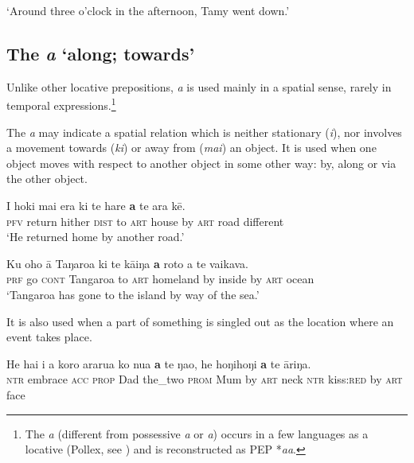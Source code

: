 \glt 
‘Around three o’clock in the afternoon, Tamy went down.’ \textstyleExampleref{[R315.273]} 
\z
{}
\subsection{The  \textit{a} ‘along; towards’}\label{sec:4.7.6}

Unlike other locative prepositions, \textit{a} is used mainly in a spatial sense, rarely in temporal expressions.\footnote{\label{fn:232}The  \textit{a} (different from possessive \textit{a} or \textit{{\ꞌ}a}) occurs in a few languages as a locative  (Pollex, see \citealt{GreenhillClark2011}) and is reconstructed as PEP *\textit{aa}.}  

The  \textit{a} may indicate a spatial relation which is neither stationary \mbox{(\textit{{\ꞌ}i}),} nor involves a movement towards (\textit{ki}) or away from (\textit{mai}) an object. It is used when one object moves with respect to another object in some other way: by, along or via the other object.

\ea\label{ex:4.278}
\gll I hoki mai era ki te hare \textbf{a} te ara kē. \\
\textsc{pfv} return hither \textsc{dist} to \textsc{art} house by \textsc{art} road different \\

\glt 
‘He returned home by another road.’ \textstyleExampleref{[R408.038]} 
\z

\ea\label{ex:4.279}
\gll Ku oho {\ꞌ}ā Taŋaroa ki te kāiŋa \textbf{a} roto a te vaikava. \\
\textsc{prf} go \textsc{cont} Tangaroa to \textsc{art} homeland by inside by \textsc{art} ocean \\

\glt
‘Tangaroa has gone to the island by way of the sea.’ \textstyleExampleref{[Ley-1-06.007]}
\z

It is also used when a part of something is singled out as the location where an event takes place. 

\ea\label{ex:4.280}
\gll He ha{\ꞌ}i i a koro ararua ko nua \textbf{a} te ŋao, he hoŋihoŋi \textbf{a} te {\ꞌ}āriŋa.\\
\textsc{ntr} embrace \textsc{acc} \textsc{prop} Dad the\_two \textsc{prom} Mum by \textsc{art} neck \textsc{ntr} kiss:\textsc{red} by \textsc{art} face\\

